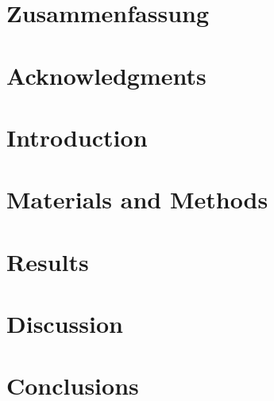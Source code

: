 \documentclass[
    12pt,
    a4paper,
	chapterprefix=false,
	parskip=full,
	headings=normal,
	numbers=noenddot
]{scrreprt}
\begin{document}


\newpage

\chapter*{Zusammenfassung}



\newpage

\chapter*{Acknowledgments}

\newpage

\renewcommand{\contentsname}{Contents}
\hypersetup{linkcolor=black}
\tableofcontents
\hypersetup{linkcolor=darkblue}

\newpage


\chapter{Introduction}




\chapter{Materials and Methods}




\chapter{Results}



\chapter{Discussion}




\chapter{Conclusions}




\appendix
\end{document}
